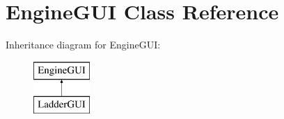 \hypertarget{class_engine_g_u_i}{\section{Engine\-G\-U\-I Class Reference}
\label{class_engine_g_u_i}
}
Inheritance diagram for Engine\-G\-U\-I\-:\begin{figure}[H]
\begin{center}
\leavevmode
\includegraphics[height=2.000000cm]{class_engine_g_u_i}
\end{center}
\end{figure}
